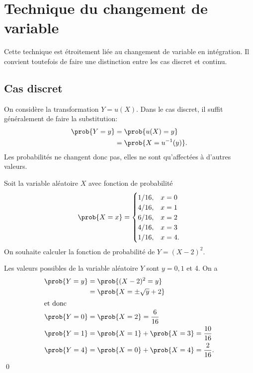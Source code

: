 \section{Technique du changement de variable}

Cette technique est étroitement liée au changement de variable en
intégration. Il convient toutefois de faire une distinction entre les
cas discret et continu.


\subsection{Cas discret}

On considère la transformation $Y = u(X)$. Dans le cas discret, il
suffit généralement de faire la substitution:
\begin{align*}
  \prob{Y = y}
  &= \prob{u(X) = y} \\
  &= \prob{X = u^{-1}(y)}.
\end{align*}
Les probabilités ne changent donc pas, elles ne sont qu'affectées à
d'autres valeurs.

\begin{exemple}
  Soit la variable aléatoire $X$ avec fonction de probabilité
  \begin{displaymath}
    \prob{X = x} =
    \begin{cases}
      1/16, & x = 0 \\
      4/16, & x = 1 \\
      6/16, & x = 2 \\
      4/16, & x = 3 \\
      1/16, & x = 4.
    \end{cases}
  \end{displaymath}
  On souhaite calculer la fonction de probabilité de $Y = (X - 2)^2$.

  Les valeurs possibles de la variable aléatoire $Y$ sont $y = 0, 1$
  et 4. On a
  \begin{align*}
    \prob{Y = y}
    &= \prob{(X - 2)^2 = y} \\
    &= \prob{X = \pm \sqrt{y} + 2} \\
    \intertext{et donc}
    \prob{Y = 0}  &= \prob{X = 2} = \frac{6}{16} \\
    \prob{Y = 1}  &= \prob{X = 1} + \prob{X = 3}  = \frac{10}{16} \\
    \prob{Y = 4}  &= \prob{X = 0} + \prob{X = 4}  = \frac{2}{16}.
  \end{align*}
  \qed
\end{exemple}


